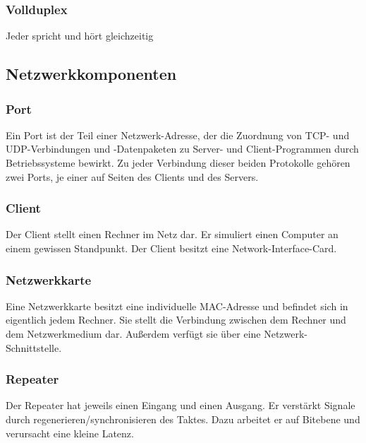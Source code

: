 \documentclass[12pt,a4paper]{article}
\begin{document}
\subsubsection{Vollduplex}
    Jeder spricht und hört gleichzeitig

\subsection{Netzwerkkomponenten}

\subsubsection{Port}
    Ein Port ist der Teil einer Netzwerk-Adresse, der die Zuordnung von TCP- und UDP-Verbindungen und -Datenpaketen zu Server- und Client-Programmen durch Betriebssysteme bewirkt. Zu jeder Verbindung dieser beiden Protokolle gehören zwei Ports, je einer auf Seiten des Clients und des Servers.

\subsubsection{Client}
    Der Client stellt einen Rechner im Netz dar. Er simuliert einen Computer an einem gewissen Standpunkt. Der Client besitzt eine Network-Interface-Card.
    \begin{center}
    \end{center}

\subsubsection{Netzwerkkarte}
    Eine Netzwerkkarte besitzt eine individuelle MAC-Adresse und befindet sich in eigentlich jedem Rechner. Sie stellt die Verbindung zwischen dem Rechner und dem Netzwerkmedium dar. Außerdem verfügt sie über eine Netzwerk-Schnittstelle.

\subsubsection{Repeater}
    Der Repeater hat jeweils einen Eingang und einen Ausgang. Er verstärkt Signale durch regenerieren/synchronisieren des Taktes. Dazu arbeitet er auf Bitebene und verursacht eine kleine Latenz.
        \begin{center}
        \end{center}
\end{document}

